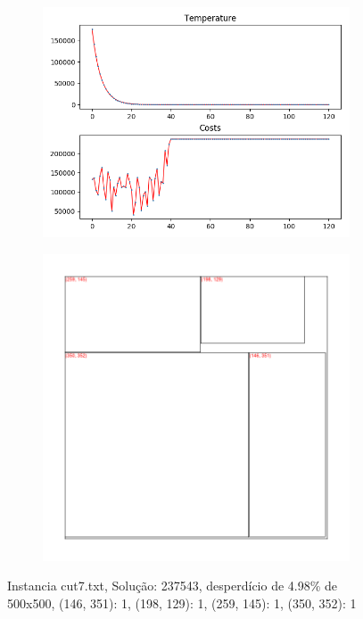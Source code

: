 \begin{figure}
\centering
\begin{subfigure}{.5\textwidth}
  \centering
  \includegraphics[width=1\linewidth]{results/cut7/3/plot}
  \label{fig:sub1}
\end{subfigure}%
\begin{subfigure}{.5\textwidth}
  \centering
  \includegraphics[width=1\linewidth]{results/cut7/3/cut}
  \label{fig:sub2}
\end{subfigure}
\caption{Instancia cut7.txt, Solução: 237543, desperdício de 4.98\% de 500x500, {(146, 351): 1, (198, 129): 1, (259, 145): 1, (350, 352): 1}}
\label{fig:test}
\end{figure}


